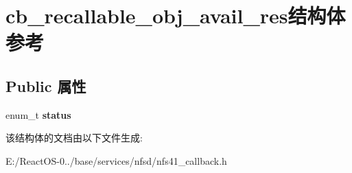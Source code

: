 \hypertarget{structcb__recallable__obj__avail__res}{}\section{cb\+\_\+recallable\+\_\+obj\+\_\+avail\+\_\+res结构体 参考}
\label{structcb__recallable__obj__avail__res}
\subsection*{Public 属性}
\begin{DoxyCompactItemize}
\item 
\mbox{\label{structcb__recallable__obj__avail__res_a62266adfc59ca63dd0270772d3a863b9}} 
enum\+\_\+t {\bfseries status}
\end{DoxyCompactItemize}


该结构体的文档由以下文件生成\+:\begin{DoxyCompactItemize}
\item 
E\+:/\+React\+O\+S-\/0../base/services/nfsd/nfs41\+\_\+callback.\+h\end{DoxyCompactItemize}
